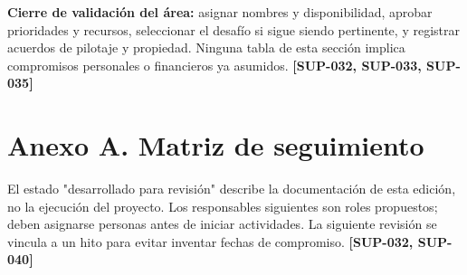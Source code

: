 \documentclass[10pt,a4paper]{article}
\begin{document}
\textbf{Cierre de validación del área:} asignar nombres y disponibilidad, aprobar prioridades y recursos, seleccionar el desafío si sigue siendo pertinente, y registrar acuerdos de pilotaje y propiedad. Ninguna tabla de esta sección implica compromisos personales o financieros ya asumidos. \textbf{[SUP-032, SUP-033, SUP-035]}


\clearpage\section{Anexo A. Matriz de seguimiento}\label{anexo-a-matriz-de-seguimiento}

El estado "desarrollado para revisión" describe la documentación de esta edición, no la ejecución del proyecto. Los responsables siguientes son roles propuestos; deben asignarse personas antes de iniciar actividades. La siguiente revisión se vincula a un hito para evitar inventar fechas de compromiso. \textbf{[SUP-032, SUP-040]}
\end{document}
